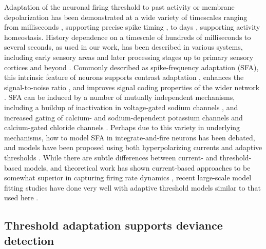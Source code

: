 \documentclass[9pt,lineno,onehalfspacing]{elife}
\begin{document}
Adaptation of the neuronal firing threshold to past activity or membrane depolarization has been demonstrated at a wide variety of timescales ranging from milliseconds \citep{Henze2001-xd, Badel2008-ld, Higgs2011-cy}, supporting precise spike timing \citep{Azouz2000-vh, Huang2016-ch}, to days \citep{OLeary2010-ar}, supporting activity homeostasis. History dependence on a timescale of hundreds of milliseconds to several seconds, as used in our work, has been described in various systems, including early sensory areas \citep{Baccus2002-jb, Wark2009-sf} and later processing stages up to primary sensory cortices and beyond \citep{Spain1991-fg, Sanchez-Vives2000-df, Henze2001-xd, La_Camera2006-dz, Abolafia2011-ig}. Commonly described as spike-frequency adaptation (SFA), this intrinsic feature of neurons supports contrast adaptation \citep{Sanchez-Vives2000-df, Wang2003-vv}, enhances the signal-to-noise ratio \citep{Wark2007-rx, Chacron2007-ak}, and improves signal coding properties of the wider network \citep{Prescott2008-oa, Bohte2012-gk, Lee2023-bu}. SFA can be induced by a number of mutually independent mechanisms, including a buildup of inactivation in voltage-gated sodium channels \citep{Fleidervish1996-ly, Miles2005-nz}, and increased gating of calcium- and sodium-dependent potassium channels \citep{Madison1984-zc, Schwindt1989-lv, Sanchez-Vives2000-rv, Wang2003-vv, Faber2005-vc} and calcium-gated chloride channels \citep{Ha2016-lc, Ha2017-bh}. Perhaps due to this variety in underlying mechanisms, how to model SFA in integrate-and-fire neurons has been debated, and models have been proposed using both hyperpolarizing currents \citep{Izhikevich2003-ty, Brette2005-ci} and adaptive thresholds \citep{Segundo1968-eu, Chacron2003-oz, Kobayashi2009-av}. While there are subtle differences between current- and threshold-based models, and theoretical work has shown current-based approaches to be somewhat superior in capturing firing rate dynamics \citep{Liu2001-yw, Benda2010-tz}, recent large-scale model fitting studies have done very well with adaptive threshold models similar to that used here \citep{Pozzorini2015-ei, Teeter2018-iz}.

\subsection{Threshold adaptation supports deviance detection}
\end{document}
